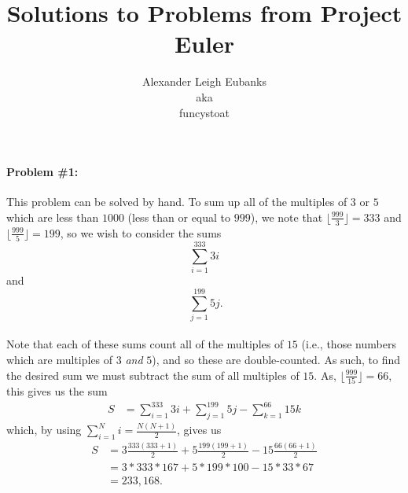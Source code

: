 \documentclass[12pt,letterpaper]{article}
\author{Alexander Leigh Eubanks \\ aka \\ funcystoat}
\title{Solutions to Problems from Project Euler}
\begin{document}
\maketitle
\paragraph{Problem \#1:}  
This problem can be solved by hand. 
To sum up all of the multiples of $3$ or $5$ which are less than $1000$ (less than or equal to $999$), we note that $\lfloor \frac{999}{3} \rfloor = 333$ and $\lfloor \frac{999}{5} \rfloor = 199$,
so we wish to consider the sums
\[
	\sum_{i=1}^{333} 3i
\]
and
\[
	\phantom{.}\sum_{j=1}^{199} 5j.
\]
\paragraph{} Note that each of these sums count all of the multiples of $15$ (i.e., those numbers which are multiples of $3$ \textit{and} $5$), and so these are double-counted. As such, to find the desired sum we must subtract the sum of all multiples of $15$. As, $\lfloor \frac{999}{15} \rfloor = 66$, this gives us the sum
\begin{align*}
	S 	&= \sum_{i=1}^{333} 3i + \sum_{j=1}^{199} 5j - \sum_{k=1}^{66} 15k
\end{align*}
which, by using $\sum_{i=1}^N i = \frac{N(N+1)}{2}$, gives us
\begin{align*}
	S	&= 3\frac{333(333+1)}{2} + 5\frac{199(199+1)}{2} - 15\frac{66(66+1)}{2}\\
		&= 3*333*167 + 5*199*100 - 15*33*67\\
		&= 233,168.
\end{align*}
\end{document}
